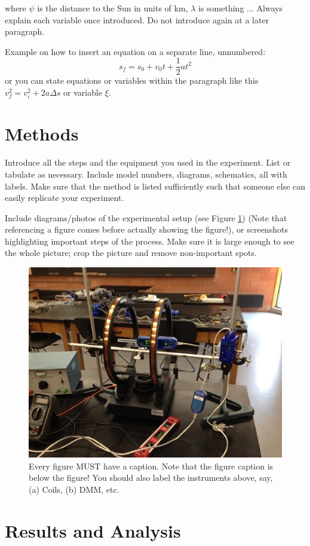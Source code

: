 \documentclass[letterpaper,11pt]{article}
\begin{document}
where $\psi$ is the distance to the Sun in units of km, $\lambda$ is something ... Always explain each variable once introduced. Do not introduce again at a later paragraph. 

Example on how to insert an equation on a separate line, unnumbered:
$$s_f=s_0+v_0t+\frac{1}{2}at^2$$
or you can state equations or variables within the paragraph like this $v_f^2=v_i^2+2a\Delta s$ or variable $\xi$.

\section{Methods}
Introduce all the steps and the equipment you used in the experiment. List or tabulate as necessary. Include model numbers, diagrams, schematics, all with labels. Make sure that the method is listed sufficiently such that someone else can easily replicate your experiment.

Include diagrams/photos of the experimental setup (see Figure \ref{fig1}) (Note that referencing a figure comes before actually showing the figure!), or screenshots highlighting important steps of the process. Make sure it is large enough to see the whole picture; crop the picture and remove non-important spots.

\begin{figure}[ht] 
        \centering \includegraphics[width=0.9\columnwidth]{HCoil}
        \caption{\label{fig1}Every figure MUST have a caption. Note that the figure caption is below the figure! You should also label the instruments above, say, (a) Coils, (b) DMM, etc.
        }
\end{figure}

\section{Results and Analysis}
\end{document}
